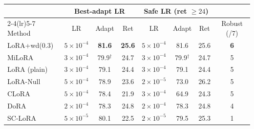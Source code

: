 \begin{tabular}{l ccc ccc c}
\toprule
 & \multicolumn{3}{c}{\textbf{Best-adapt LR}} & \multicolumn{3}{c}{\textbf{Safe LR (ret $\ge 24$)}} & \\
\cmidrule(lr){2-4}\cmidrule(lr){5-7}
Method & LR & Adapt & Ret & LR & Adapt & Ret & Robust (/7) \\
\midrule
LoRA+wd(0.3) & $5\!\times\!10^{-4}$ & \textbf{81.6} & \textbf{25.6} & $5\!\times\!10^{-4}$ & 81.6 & 25.6 & \textbf{6} \\
MiLoRA       & $3\!\times\!10^{-4}$ & 79.9$^{\dagger}$ & 24.7 & $3\!\times\!10^{-4}$ & 79.9$^{\dagger}$ & 24.7 & 5 \\
LoRA (plain) & $3\!\times\!10^{-4}$ & 79.1 & 24.4 & $3\!\times\!10^{-4}$ & 79.1 & 24.4 & 5 \\
LoRA-Null    & $5\!\times\!10^{-4}$ & 78.9 & 23.6 & $2\!\times\!10^{-5}$ & 73.0 & 26.2 & 5 \\
CLoRA        & $5\!\times\!10^{-4}$ & 78.4 & 21.9 & $3\!\times\!10^{-4}$ & 64.9 & 24.3 & 5 \\
DoRA         & $2\!\times\!10^{-4}$ & 78.3 & 24.8 & $2\!\times\!10^{-4}$ & 78.3 & 24.8 & 4 \\
SC-LoRA      & $5\!\times\!10^{-5}$ & 80.1 & 22.5 & $2\!\times\!10^{-5}$ & 79.5 & 25.3 & 1 \\
\bottomrule
\end{tabular}
